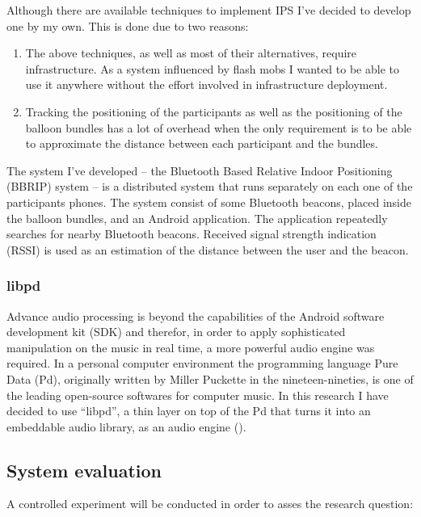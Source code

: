 Although there are available techniques to implement IPS I've decided to develop one by my own. This is done due to two reasons:
\begin{enumerate}
	\item The above techniques, as well as most of their alternatives, require infrastructure. As a system influenced by flash mobs I wanted to be able to use it anywhere without the effort involved in infrastructure deployment.
	\item Tracking the positioning of the participants as well as the positioning of the balloon bundles has a lot of overhead when the only requirement is to be able to approximate the distance between each participant and the bundles.
\end{enumerate}


The system I've developed -- the Bluetooth Based Relative Indoor Positioning (BBRIP) system -- is a distributed system that runs separately on each one of the participants phones. The system consist of some Bluetooth beacons, placed inside the balloon bundles, and an Android application. The application repeatedly searches for nearby Bluetooth beacons. Received signal strength indication (RSSI) is used as an estimation of the distance between the user and the beacon.

\subsubsection{libpd}

Advance audio processing is beyond the capabilities of the Android software development kit (SDK) and therefor, in order to apply sophisticated manipulation on the music in real time, a more powerful audio engine was required. In a personal computer environment the programming language Pure Data (Pd), originally written by Miller Puckette in the nineteen-nineties, is one of the leading open-source softwares for computer music. In this research I have decided to use ``libpd'', a thin layer on top of the Pd that turns it into an embeddable audio library, as an audio engine ().

\subsection{System evaluation}

A controlled experiment will be conducted in order to asses the research question: \emph{\reserchquestion}

